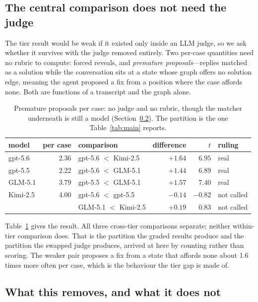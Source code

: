 \documentclass{article} %
\begin{document}
\subsection{The central comparison does not need the judge}

The tier result would be weak if it existed only inside an LLM judge, so
we ask whether it survives with the judge removed entirely. Two per-case
quantities need no rubric to compute: forced reveals, and \emph{premature
proposals}---replies matched as a solution while the conversation sits at
a state whose graph offers no solution edge, meaning the agent proposed a
fix from a position where the case affords none. Both are functions of a
transcript and the graph alone.

\begin{table}[h]
\caption{Premature proposals per case: no judge and no rubric, though the
matcher underneath is still a model (Section~\ref{sec:matcherdep}). The
partition is the one Table~\ref{tab:main} reports.}
\label{tab:judgefree}
\centering
\small
\begin{tabular}{lr@{\hskip 2.5em}lrrl}
\toprule
model & per case & comparison & difference & $t$ & ruling \\
\midrule
gpt-5.6  & 2.36 & gpt-5.6 $<$ Kimi-2.5 & $+1.64$ & $6.95$ & real \\
gpt-5.5  & 2.22 & gpt-5.6 $<$ GLM-5.1  & $+1.44$ & $6.89$ & real \\
GLM-5.1  & 3.79 & gpt-5.5 $<$ GLM-5.1  & $+1.57$ & $7.40$ & real \\
Kimi-2.5 & 4.00 & gpt-5.6 $<$ gpt-5.5  & $-0.14$ & $-0.82$ & not called \\
         &      & GLM-5.1 $<$ Kimi-2.5 & $+0.19$ & $0.83$ & not called \\
\bottomrule
\end{tabular}
\end{table}

Table~\ref{tab:judgefree} gives the result. All three cross-tier
comparisons separate; neither within-tier comparison does. That is the
partition the graded results produce and the partition the swapped judge
produces, arrived at here by counting rather than scoring. The weaker
pair proposes a fix from a state that affords none about 1.6 times more
often per case, which is the behaviour the tier gap is made of.

\subsection{What this removes, and what it does not}
\label{sec:matcherdep}
\end{document}
